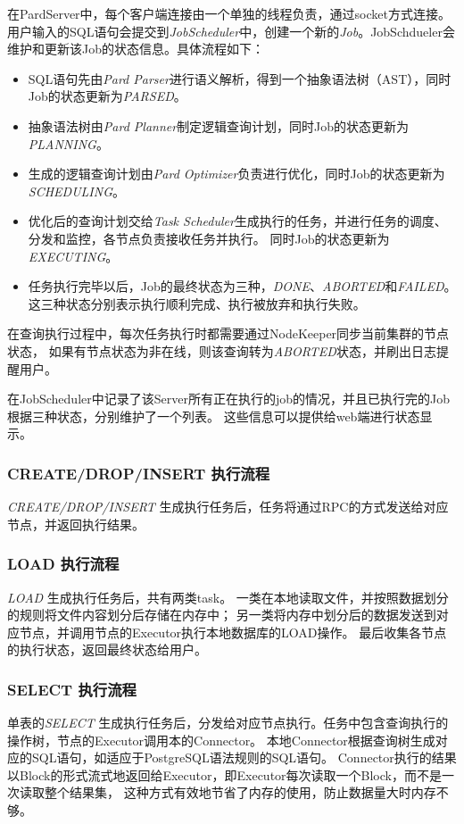 \documentclass[a4paper, 12pt]{ctexart}
\begin{document}
在PardServer中，每个客户端连接由一个单独的线程负责，通过socket方式连接。
用户输入的SQL语句会提交到\textit{JobScheduler}中，创建一个新的\textit{Job}。JobSchdueler会维护和更新该Job的状态信息。具体流程如下：
\begin{itemize}
\item SQL语句先由\textit{Pard Parser}进行语义解析，得到一个抽象语法树（AST），同时Job的状态更新为\textit{PARSED}。
\item 抽象语法树由\textit{Pard Planner}制定逻辑查询计划，同时Job的状态更新为\textit{PLANNING}。
\item 生成的逻辑查询计划由\textit{Pard Optimizer}负责进行优化，同时Job的状态更新为\textit{SCHEDULING}。
\item 优化后的查询计划交给\textit{Task Scheduler}生成执行的任务，并进行任务的调度、分发和监控，各节点负责接收任务并执行。
同时Job的状态更新为\textit{EXECUTING}。
\item 任务执行完毕以后，Job的最终状态为三种，\textit{DONE}、\textit{ABORTED}和\textit{FAILED}。这三种状态分别表示执行顺利完成、执行被放弃和执行失败。
\end{itemize}

在查询执行过程中，每次任务执行时都需要通过NodeKeeper同步当前集群的节点状态，
如果有节点状态为非在线，则该查询转为\textit{ABORTED}状态，并刷出日志提醒用户。

在JobScheduler中记录了该Server所有正在执行的job的情况，并且已执行完的Job根据三种状态，分别维护了一个列表。
这些信息可以提供给web端进行状态显示。

\subsubsection{CREATE/DROP/INSERT 执行流程}
\textit{CREATE/DROP/INSERT} 生成执行任务后，任务将通过RPC的方式发送给对应节点，并返回执行结果。

\subsubsection{LOAD 执行流程}
\textit{LOAD} 生成执行任务后，共有两类task。
一类在本地读取文件，并按照数据划分的规则将文件内容划分后存储在内存中；
另一类将内存中划分后的数据发送到对应节点，并调用节点的Executor执行本地数据库的LOAD操作。
最后收集各节点的执行状态，返回最终状态给用户。

\subsubsection{SELECT 执行流程}
单表的\textit{SELECT} 生成执行任务后，分发给对应节点执行。任务中包含查询执行的操作树，节点的Executor调用本的Connector。
本地Connector根据查询树生成对应的SQL语句，如适应于PostgreSQL语法规则的SQL语句。
Connector执行的结果以Block的形式流式地返回给Executor，即Executor每次读取一个Block，而不是一次读取整个结果集，
这种方式有效地节省了内存的使用，防止数据量大时内存不够。
\end{document}
